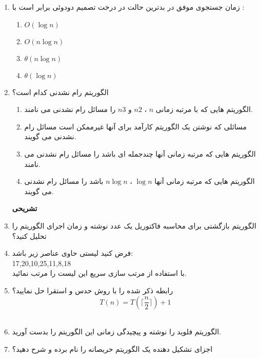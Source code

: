 \documentclass[a4paper,11pt]{article}
\begin{document}
\begin{enumerate}
	\item [24.]
زمان جستجوی موفق در بدترین حالت در درخت تصمیم دودوئی برابر است با :
	\begin{multicols}{4}
		\begin{enumerate}
		\item [1.] $ O(\log n) $
		\item [2.] $ O(n \log n) $
		\item [3.] $ \theta(n \log n) $
		\item [4.] $ \theta(\log n) $
	\end{enumerate}
	\end{multicols}	
	\item [25.]
الگوریتم رام نشدنی کدام است؟
		\begin{enumerate}
		\item [1.]
الگوریتم هایی که با مرتبه زمانی $n$ ، $n2 $ و $n3 $ را مسائل رام نشدنی می نامند.
		\item [2.]
مسائلی که نوشتن یک الگوریتم کارآمد برای آنها غیرممکن است مسائل رام نشدنی می گویند.
		\item [3.]
الگوریتم هایی که مرتبه زمانی آنها چندجمله ای باشد را مسائل رام نشدنی می نامند.
		\item [4.]
الگوریتم هایی که مرتبه زمانی آنها $\log n $ ، $n\log n $ باشد را مسائل رام نشدنی می گویند.
		\end{enumerate}
\newpage
\bf{تشریحی}
	\item [1.]
الگوریتم بازگشتی برای محاسبه فاکتوریل یک عدد نوشته و زمان اجرای الگوریتم را تحلیل کنید؟\\
	\item [2.]
فرض کنید لیستی حاوی عناصر زیر باشد:\\
17,20,10,25,11,8,18\\
با استفاده از مرتب سازی سریع این لیست را مرتب نمائید.\\
	\item [3.]
رابطه ذکر شده را با روش حدس و استقرا حل نمایید؟
\[T(n)=T( \Bigg\lceil\frac{n}{2}\Bigg\rceil)+1 \]
\\
	\item [4.]
الگوریتم فلوید را نوشته و پیچیدگی زمانی این الگوریتم را بدست آورید.\\
	\item [5.]
اجزای تشکیل دهنده یک الگوریتم حریصانه را نام برده و شرح دهید؟
\end{enumerate}
\newpage
\end{document}
